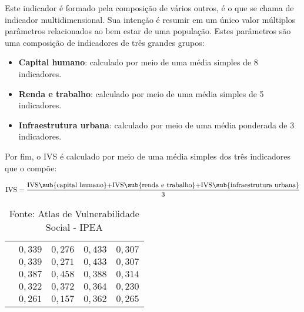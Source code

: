 Este indicador é formado pela composição de vários outros, é o que se chama de indicador multidimensional. Sua intenção é resumir em um único valor múltiplos parâmetros relacionados ao bem estar de uma população. Estes parâmetros são uma composição de indicadores de três grandes grupos:

\begin{itemize}
\item \textbf{Capital humano}: calculado por meio de uma média simples de 8 indicadores.
\item \textbf{Renda e trabalho}: calculado por meio de uma média simples de 5 indicadores.
\item \textbf{Infraestrutura urbana}: calculado por meio de uma média ponderada de 3 indicadores.
\end{itemize}

Por fim, o IVS é calculado por meio de uma média simples dos três indicadores que o compõe:

\begin{equation*}
\text{IVS}=\frac
{\text{IVS\sub{capital humano}+IVS\sub{renda e trabalho}+IVS\sub{infraestrutura urbana}}}
{3}
\end{equation*}

\begin{table}[H]
\centering

\begin{tabu} to \textwidth{|l|r|r|r|r|}
\hline
{} \\
\hline
{} &  &  &  &  \\
 & $0{,}339$ & $0{,}276$ & $0{,}433$ & $0{,}307$ \\
\hline
{} & $0{,}339$ & $0{,}271$ & $0{,}433$ & $0{,}307$ \\
\hline
{} & $0{,}387$ & $0{,}458$ & $0{,}388$ & $0{,}314$ \\ 
\hline
{} & $0{,}322$ & $0{,}372$ & $0{,}364$ & $0{,}230$ \\
\hline
{} & $0{,}261$ & $0{,}157$ & $0{,}362$ & $0{,}265$ \\
\hline
\end{tabu}

\caption{Fonte: Atlas de Vulnerabilidade Social - IPEA}
\end{table}

